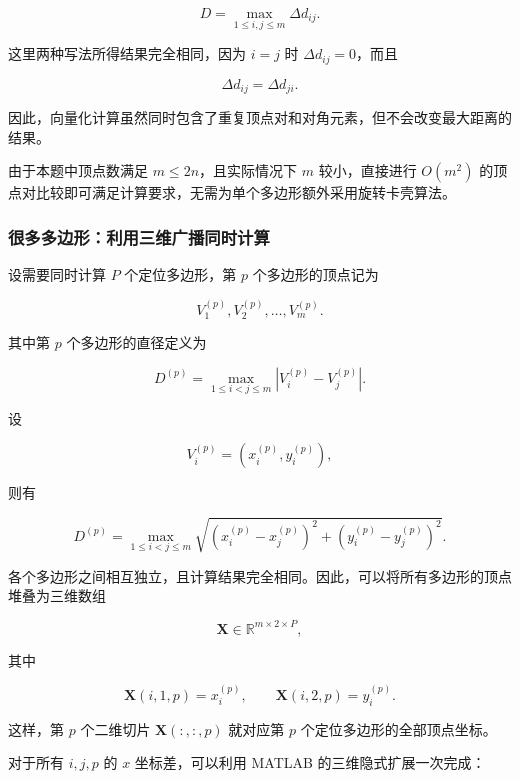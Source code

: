 \begin{equation}
D =
\max_{1\leq i,j\leq m}\Delta d_{ij}.
\end{equation}

这里两种写法所得结果完全相同，因为 $i=j$ 时 $\Delta d_{ij}=0$，而且

$$
\Delta d_{ij}=\Delta d_{ji}.
$$

因此，向量化计算虽然同时包含了重复顶点对和对角元素，但不会改变最大距离的结果。

由于本题中顶点数满足 $m\leq2n$，且实际情况下 $m$ 较小，直接进行 $O(m^2)$ 的顶点对比较即可满足计算要求，无需为单个多边形额外采用旋转卡壳算法。

\subsubsection{很多多边形：利用三维广播同时计算}

设需要同时计算 $P$ 个定位多边形，第 $p$ 个多边形的顶点记为

$$
V_1^{(p)},V_2^{(p)},\ldots,V_m^{(p)}.
$$

其中第 $p$ 个多边形的直径定义为

\begin{equation}
D^{(p)} =
\max_{1\leq i<j\leq m}
|V_i^{(p)}-V_j^{(p)}|.
\end{equation}

设

$$
V_i^{(p)}
=
\left(
x_i^{(p)},
y_i^{(p)}
\right),
$$

则有

\begin{equation}
D^{(p)} =
\max_{1\leq i<j\leq m}
\sqrt{
\left(x_i^{(p)}-x_j^{(p)}\right)^2
+
\left(y_i^{(p)}-y_j^{(p)}\right)^2
}.
\end{equation}

各个多边形之间相互独立，且计算结果完全相同。因此，可以将所有多边形的顶点堆叠为三维数组

\begin{equation}
\mathbf X\in\mathbb R^{m\times2\times P},
\end{equation}

其中

\begin{equation}
\mathbf X(i,1,p)=x_i^{(p)},
\qquad
\mathbf X(i,2,p)=y_i^{(p)}.
\end{equation}

这样，第 $p$ 个二维切片 $\mathbf X(:,:,p)$ 就对应第 $p$ 个定位多边形的全部顶点坐标。

对于所有 $i,j,p$ 的 $x$ 坐标差，可以利用 MATLAB 的三维隐式扩展一次完成：

